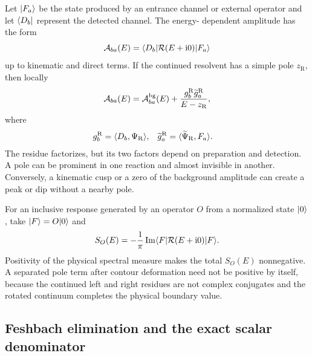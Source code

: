 Let $\lvert F_a \rangle$ be the state produced by an entrance channel or external
operator and let $\langle D_b \rvert$ represent the detected channel.  The energy-
dependent amplitude has the form
\begin{equation}
  \mathcal A_{ba}(E)
  =\langle D_b \rvert\mathcal{R}(E+\mathrm{i}0)\lvert F_a \rangle
  \label{eq:source-detector-amplitude}
\end{equation}
up to kinematic and direct terms.  If the continued resolvent has a simple
pole $z_{\mathrm R}$, then locally
\begin{equation}
  \mathcal A_{ba}(E)
  =\mathcal A_{ba}^{\mathrm{bg}}(E)
  +\frac{g_b^{\mathrm R}\widetilde g_a^{\mathrm R}}
  {E-z_{\mathrm R}},
  \label{eq:amplitude-pole-background}
\end{equation}
where
\begin{align}
  g_b^{\mathrm R}
  &=\langle D_b,\Psi_{\mathrm R}\rangle,
  &\widetilde g_a^{\mathrm R}
  &=\langle \widetilde\Psi_{\mathrm R},F_a\rangle.
  \label{eq:pole-source-detector-couplings}
\end{align}
The residue factorizes, but its two factors depend on preparation and
detection.  A pole can be prominent in one reaction and almost invisible in
another.  Conversely, a kinematic cusp or a zero of the background amplitude
can create a peak or dip without a nearby pole.

For an inclusive response generated by an operator $O$ from a normalized
state $\lvert 0 \rangle$, take $\lvert F \rangle=O\lvert 0 \rangle$ and
\begin{equation}
  S_O(E)
  =-\frac{1}{\pi}\operatorname{Im}
  \langle F \rvert\mathcal{R}(E+\mathrm{i}0)\lvert F \rangle.
  \label{eq:inclusive-response-pole-calculus}
\end{equation}
Positivity of the physical spectral measure makes the total $S_O(E)$
nonnegative.  A separated pole term after contour deformation need not be
positive by itself, because the continued left and right residues are not
complex conjugates and the rotated continuum completes the physical boundary
value.

\subsection{Feshbach elimination and the exact scalar denominator}
\label{subsec:feshbach-scalar-denominator}

